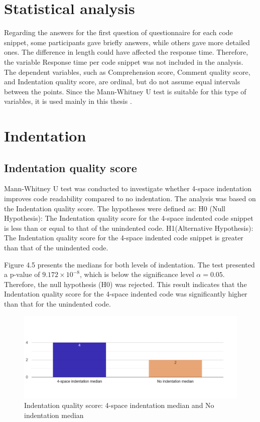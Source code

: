 \section{Statistical analysis}

Regarding the answers for the first question of questionnaire for each code snippet, some participants gave briefly answers, while others gave more detailed ones. The difference in length could have affected the response time. Therefore, the variable Response time per code snippet was not included in the analysis. The dependent variables, such as Comprehension score, Comment quality score, and Indentation quality score, are ordinal, but do not assume equal intervals between the points.
Since the Mann-Whitney U test is suitable for this type of variables, it is used mainly in this thesis \cite{MacFarland2016}. 

\section{Indentation}

\subsection{Indentation quality score}


Mann-Whitney U test was conducted to investigate whether 4-space indentation improves code readability compared to no indentation. The analysis was based on the Indentation quality score. The hypotheses were defined as:  H0 (Null Hypothesis): The Indentation quality score for the 4-space indented code snippet is less than or equal to that of the unindented code. H1(Alternative Hypothesis): The Indentation quality score for the 4-space indented code snippet is greater than that of the unindented code.

Figure 4.5 presents the medians for both levels of indentation. The test presented a p-value of \(9.172 \times 10^{-8}\), which is below the significance level \(\alpha = 0.05\). Therefore, the null hypothesis (H0) was rejected. This result indicates that the Indentation quality score for the 4-space indented code was significantly higher than that for the unindented code. 

\begin{figure} [H]
  \centering
  \includegraphics[scale=0.4]{figures/4-0-q5png.png}
  \caption{Indentation quality score: 4-space indentation median and No indentation median}
  \label{fig:AnhangsChor}
\end{figure}


